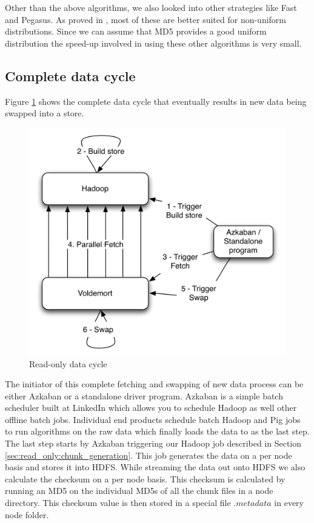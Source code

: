 \documentclass[10pt,twocolumn,preprint,natbib,authoryear]{sigplanconf}
\begin{document}
Other than the above algorithms, we also looked into other strategies like Fast and Pegasus. As proved in \cite{manolopoulos}, most of these are better suited for non-uniform distributions. Since we can assume that MD5 provides a good uniform distribution the speed-up involved in using these other algorithms is very small. 


\subsection{Complete data cycle}
\label{sec:read_only:data_cycle}

Figure \ref{cycle} shows the complete data cycle that eventually results in new data being swapped into a \projectname{} store. 

\begin{figure}
  \centering
    \includegraphics[scale=0.60]{images/cycle.png}
  \caption{Read-only data cycle}
  \label{cycle}
\end{figure}

The initiator of this complete fetching and swapping of new data process can be either Azkaban or a standalone driver program. Azkaban\cite{azkaban} is a simple batch scheduler built at LinkedIn which allows you to schedule Hadoop as well other offline batch jobs. Individual end products schedule batch Hadoop and Pig jobs to run algorithms on the raw data which finally loads the data to \projectname{} as the last step. The last step starts by Azkaban triggering our Hadoop job described in Section \ref{sec:read_only:chunk_generation}. This job generates the data on a per node basis and stores it into HDFS. While streaming the data out onto HDFS we also calculate the checksum on a per node basis. This checksum is calculated by running an MD5 on the individual MD5s of all the chunk files in a node directory. This checksum value is then stored in a special file $.metadata$ in every node folder. 
\end{document}
